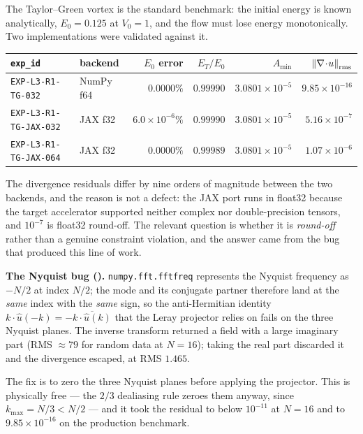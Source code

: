 The Taylor--Green vortex is the standard benchmark: the initial energy is
known analytically, \(E_0=0.125\) at \(V_0=1\), and the flow must lose energy
monotonically. Two implementations were validated against it.

\begin{center}
\small
\begin{tabular}{@{}l l r r r r@{}}
\toprule
\texttt{exp\_id} & backend & \(E_0\) error & \(E_T/E_0\) & \(A_{\min}\) &
\(\left\|\nabla\!\cdot\!u\right\|_{\mathrm{rms}}\) \\
\midrule
\texttt{EXP-L3-R1-TG-032} & NumPy f64 & \(0.0000\%\) & \(0.99990\) &
  \(3.0801\!\times\!10^{-5}\) & \(9.85\!\times\!10^{-16}\) \\
\texttt{EXP-L3-R1-TG-JAX-032} & JAX f32 & \(6.0\!\times\!10^{-6}\%\) &
  \(0.99990\) & \(3.0801\!\times\!10^{-5}\) & \(5.16\!\times\!10^{-7}\) \\
\texttt{EXP-L3-R1-TG-JAX-064} & JAX f32 & \(0.0000\%\) & \(0.99989\) &
  \(3.0801\!\times\!10^{-5}\) & \(1.07\!\times\!10^{-6}\) \\
\bottomrule
\end{tabular}
\end{center}

\medskip
The divergence residuals differ by nine orders of magnitude between the two
backends, and the reason is not a defect: the JAX port runs in float32 because
the target accelerator supported neither complex nor double-precision tensors,
and \(10^{-7}\) is float32 round-off. The relevant question is whether it is
\emph{round-off} rather than a genuine constraint violation, and the answer
came from the bug that produced this line of work.

\begin{record}
\textbf{The Nyquist bug ().} \texttt{numpy.fft.fftfreq} represents the
Nyquist frequency as \(-N/2\) at index \(N/2\); the mode and its conjugate
partner therefore land at the \emph{same} index with the \emph{same} sign, so
the anti-Hermitian identity \(k\cdot\hat u(-k)=-\overline{k\cdot\hat u(k)}\)
that the Leray projector relies on fails on the three Nyquist planes. The
inverse transform returned a field with a large imaginary part (RMS
\(\approx79\) for random data at \(N=16\)); taking the real part discarded it
and the divergence escaped, at RMS \(1.465\).

The fix is to zero the three Nyquist planes before applying the projector.
This is physically free --- the \(2/3\) dealiasing rule zeroes them anyway,
since \(k_{\max}=N/3<N/2\) --- and it took the residual to below \(10^{-11}\)
at \(N=16\) and to \(9.85\times10^{-16}\) on the production benchmark.
\end{record}


